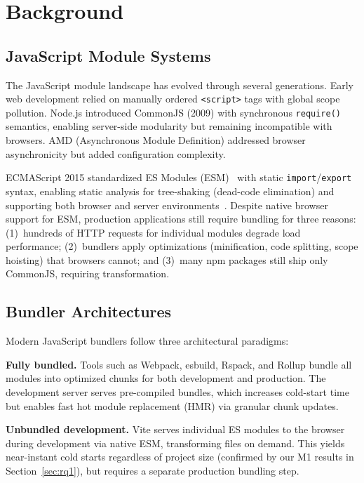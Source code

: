 \documentclass[preprint,12pt]{elsarticle}
\begin{document}
\section{Background}\label{sec:background}

\subsection{JavaScript Module Systems}

The JavaScript module landscape has evolved through several generations.
Early web development relied on manually ordered \texttt{<script>} tags with global scope pollution.
Node.js introduced CommonJS (2009) with synchronous \texttt{require()} semantics, enabling server-side modularity but remaining incompatible with browsers.
AMD (Asynchronous Module Definition) addressed browser asynchronicity but added configuration complexity.

ECMAScript 2015 standardized ES Modules (ESM)~\cite{ecma2015modules} with static \texttt{import}/\texttt{export} syntax, enabling static analysis for tree-shaking (dead-code elimination) and supporting both browser and server environments~\cite{nodejs2024esm}.
Despite native browser support for ESM, production applications still require bundling for three reasons: (1)~hundreds of HTTP requests for individual modules degrade load performance; (2)~bundlers apply optimizations (minification, code splitting, scope hoisting) that browsers cannot; and (3)~many npm packages still ship only CommonJS, requiring transformation.

\subsection{Bundler Architectures}

Modern JavaScript bundlers follow three architectural paradigms:

\textbf{Fully bundled.}
Tools such as Webpack, esbuild, Rspack, and Rollup bundle all modules into optimized chunks for both development and production.
The development server serves pre-compiled bundles, which increases cold-start time but enables fast hot module replacement (HMR) via granular chunk updates.

\textbf{Unbundled development.}
Vite serves individual ES modules to the browser during development via native ESM, transforming files on demand.
This yields near-instant cold starts regardless of project size (confirmed by our M1 results in Section~\ref{sec:rq1}), but requires a separate production bundling step.
\end{document}
